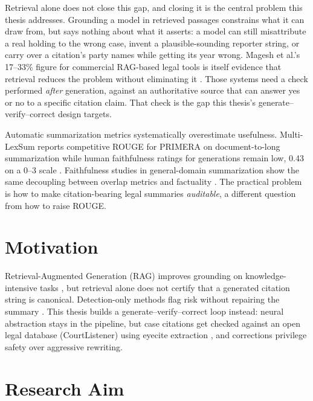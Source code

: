 Retrieval alone does not close this gap, and closing it is the central problem this thesis addresses. Grounding a model in retrieved passages constrains what it can draw from, but says nothing about what it asserts: a model can still misattribute a real holding to the wrong case, invent a plausible-sounding reporter string, or carry over a citation's party names while getting its year wrong. Magesh et al.'s 17--33\% figure for commercial RAG-based legal tools is itself evidence that retrieval reduces the problem without eliminating it \cite{magesh2025hallucinationfree}. Those systems need a check performed \emph{after} generation, against an authoritative source that can answer yes or no to a specific citation claim. That check is the gap this thesis's generate--verify--correct design targets.

Automatic summarization metrics systematically overestimate usefulness. Multi-LexSum reports competitive ROUGE for PRIMERA on document-to-long summarization while human faithfulness ratings for generations remain low, 0.43 on a 0--3 scale \cite{shen2022multilexsum}. Faithfulness studies in general-domain summarization show the same decoupling between overlap metrics and factuality \cite{maynez2020faithfulness,pagnoni2021factuality,kryscinski2020evaluating,honovich2022true}. The practical problem is how to make citation-bearing legal summaries \emph{auditable}, a different question from how to raise ROUGE.

\section{Motivation}
\label{sec:intro-motivation}

Retrieval-Augmented Generation (RAG) improves grounding on knowledge-intensive tasks \cite{lewis2020rag}, but retrieval alone does not certify that a generated citation string is canonical. Detection-only methods flag risk without repairing the summary \cite{noel2025hallugraph,manakul2023selfcheckgpt}. This thesis builds a generate--verify--correct loop instead: neural abstraction stays in the pipeline, but case citations get checked against an open legal database (CourtListener) using eyecite extraction \cite{courtlistener_api,eyecite2021}, and corrections privilege safety over aggressive rewriting.

\section{Research Aim}
\label{sec:intro-aim}

